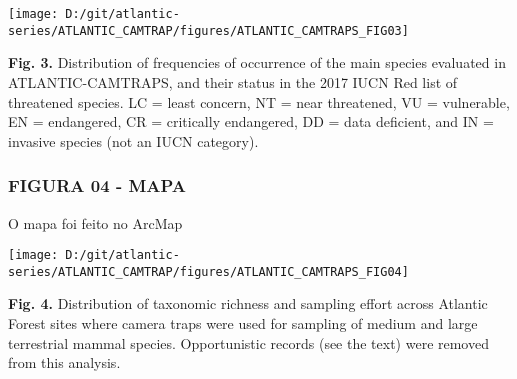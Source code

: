 \documentclass[
]{article}
\begin{document}
\texttt{[image: D:/git/atlantic-series/ATLANTIC\_CAMTRAP/figures/ATLANTIC\_CAMTRAPS\_FIG03]}

\textbf{Fig. 3.} Distribution of frequencies of occurrence of the main
species evaluated in ATLANTIC-CAMTRAPS, and their status in the 2017
IUCN Red list of threatened species. LC = least concern, NT = near
threatened, VU = vulnerable, EN = endangered, CR = critically
endangered, DD = data deficient, and IN = invasive species (not an IUCN
category).

\hypertarget{figura-04---mapa}{%
\subsubsection{FIGURA 04 - MAPA}\label{figura-04---mapa}}

O mapa foi feito no ArcMap

\texttt{[image: D:/git/atlantic-series/ATLANTIC\_CAMTRAP/figures/ATLANTIC\_CAMTRAPS\_FIG04]}

\textbf{Fig. 4.} Distribution of taxonomic richness and sampling effort
across Atlantic Forest sites where camera traps were used for sampling
of medium and large terrestrial mammal species. Opportunistic records
(see the text) were removed from this analysis.
\end{document}
